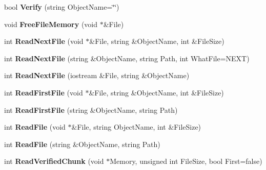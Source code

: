 \begin{DoxyCompactItemize}
\item 
\hypertarget{class_c_tar_a679f409c4f835d363a507702c0512fef}{
bool {\bfseries Verify} (string ObjectName=\char`\"{}\char`\"{})}
\label{class_c_tar_a679f409c4f835d363a507702c0512fef}

\item 
\hypertarget{class_c_tar_a21ba8b1b1d071fad3a9add2e2493c22e}{
void {\bfseries FreeFileMemory} (void $\ast$\&File)}
\label{class_c_tar_a21ba8b1b1d071fad3a9add2e2493c22e}

\item 
\hypertarget{class_c_tar_a8af549ddea27e3ba3e0ddd53a1219ed9}{
int {\bfseries ReadNextFile} (void $\ast$\&File, string \&ObjectName, int \&FileSize)}
\label{class_c_tar_a8af549ddea27e3ba3e0ddd53a1219ed9}

\item 
\hypertarget{class_c_tar_a920413976480315483f36f0207c7b879}{
int {\bfseries ReadNextFile} (string \&ObjectName, string Path, int WhatFile=NEXT)}
\label{class_c_tar_a920413976480315483f36f0207c7b879}

\item 
\hypertarget{class_c_tar_ae7d5f7bad40be60dac31b4ff98f6dce9}{
int {\bfseries ReadNextFile} (iostream \&File, string \&ObjectName)}
\label{class_c_tar_ae7d5f7bad40be60dac31b4ff98f6dce9}

\item 
\hypertarget{class_c_tar_a1ea487a4c42ba4a0478df3fa5acad6e9}{
int {\bfseries ReadFirstFile} (void $\ast$\&File, string \&ObjectName, int \&FileSize)}
\label{class_c_tar_a1ea487a4c42ba4a0478df3fa5acad6e9}

\item 
\hypertarget{class_c_tar_af29222aed442829266b861e67f43e357}{
int {\bfseries ReadFirstFile} (string \&ObjectName, string Path)}
\label{class_c_tar_af29222aed442829266b861e67f43e357}

\item 
\hypertarget{class_c_tar_abc068d5e0d70d566c931df3eb88d129f}{
int {\bfseries ReadFile} (void $\ast$\&File, string ObjectName, int \&FileSize)}
\label{class_c_tar_abc068d5e0d70d566c931df3eb88d129f}

\item 
\hypertarget{class_c_tar_a5bd2440642a048123b8b79c287cd5b7e}{
int {\bfseries ReadFile} (string \&ObjectName, string Path)}
\label{class_c_tar_a5bd2440642a048123b8b79c287cd5b7e}

\item 
\hypertarget{class_c_tar_acfae0bec803ff71f94fdf0b303d6173e}{
int {\bfseries ReadVerifiedChunk} (void $\ast$Memory, unsigned int FileSize, bool First=false)}
\label{class_c_tar_acfae0bec803ff71f94fdf0b303d6173e}


\end{DoxyCompactItemize}
